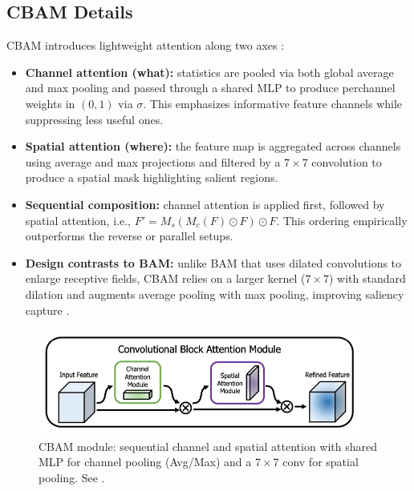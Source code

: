 \subsection{CBAM Details}
CBAM introduces lightweight attention along two axes \cite{woo2018cbam,cbamMedium,cbamDO}:
\begin{itemize}
  \item \textbf{Channel attention (what):} statistics are pooled via both global average and max pooling and passed through a shared MLP to produce per\textendash channel weights in $(0,1)$ via $\sigma$. This emphasizes informative feature channels while suppressing less useful ones.
  \item \textbf{Spatial attention (where):} the feature map is aggregated across channels using average and max projections and filtered by a $7\times7$ convolution to produce a spatial mask highlighting salient regions.
  \item \textbf{Sequential composition:} channel attention is applied first, followed by spatial attention, i.e., $F' = M_s(M_c(F)\odot F)\odot F$. This ordering empirically outperforms the reverse or parallel setups.
  \item \textbf{Design contrasts to BAM:} unlike BAM that uses dilated convolutions to enlarge receptive fields, CBAM relies on a larger kernel ($7\times7$) with standard dilation and augments average pooling with max pooling, improving saliency capture \cite{cbamMedium}.
\end{itemize}

\begin{figure}[t]
  \centering
  \includegraphics[width=0.95\textwidth]{../new_work/figures/about-cbam/cbam-architecture.png}
  \caption{CBAM module: sequential channel and spatial attention with shared MLP for channel pooling (Avg/Max) and a $7\times7$ conv for spatial pooling. See \cite{woo2018cbam,cbamMedium,cbamDO}.}
  \label{fig:cbam_module}
\end{figure}

